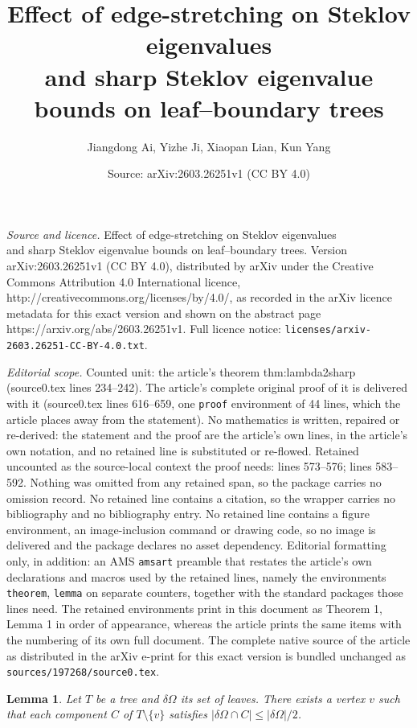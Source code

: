 \documentclass[10pt,a4paper]{amsart}
\title{Effect of edge-stretching on Steklov eigenvalues \\and sharp Steklov eigenvalue bounds on leaf--boundary trees}
\author{Jiangdong Ai, Yizhe Ji, Xiaopan Lian, Kun Yang}
\date{Source: arXiv:2603.26251v1 (CC BY 4.0)}
\newtheorem{lemma}{Lemma}
\newcommand{\dO}{\delta\Omega}
\begin{document}
\maketitle

\noindent\emph{Source and licence.} Effect of edge-stretching on Steklov eigenvalues \\and sharp Steklov eigenvalue bounds on leaf--boundary trees. Version arXiv:2603.26251v1 (CC BY 4.0), distributed by arXiv under the Creative Commons Attribution 4.0 International licence, http://creativecommons.org/licenses/by/4.0/, as recorded in the arXiv licence metadata for this exact version and shown on the abstract page https://arxiv.org/abs/2603.26251v1. Full licence notice: \texttt{licenses/arxiv-2603.26251-CC-BY-4.0.txt}.\par\smallskip

\noindent\textit{Editorial scope.} Counted unit: the article's theorem thm:lambda2sharp (source0.tex lines 234--242). The article's complete original proof of it is delivered with it (source0.tex lines 616--659, one \texttt{proof} environment of 44 lines, which the article places away from the statement). No mathematics is written, repaired or re-derived: the statement and the proof are the article's own lines, in the article's own notation, and no retained line is substituted or re-flowed.  Retained uncounted as the source-local context the proof needs: lines 573--576; lines 583--592.  Nothing was omitted from any retained span, so the package carries no omission record.  No retained line contains a citation, so the wrapper carries no bibliography and no bibliography entry.  No retained line contains a figure environment, an image-inclusion command or drawing code, so no image is delivered and the package declares no asset dependency.  Editorial formatting only, in addition: an AMS \texttt{amsart} preamble that restates the article's own declarations and macros used by the retained lines, namely the environments \texttt{theorem}, \texttt{lemma} on separate counters, together with the standard packages those lines need.  The retained environments print in this document as Theorem 1, Lemma 1 in order of appearance, whereas the article prints the same items with the numbering of its own full document.  The complete native source of the article as distributed in the arXiv e-print for this exact version is bundled unchanged as \texttt{sources/197268/source0.tex}.
\begin{lemma}\label{lem:centroid}
Let $T$ be a tree and $\dO$ its set of leaves.
There exists a vertex $v$ such that each component $C$ of $T\setminus\{v\}$ satisfies $|\dO\cap C|\le |\dO|/2$.
\end{lemma}
\end{document}
